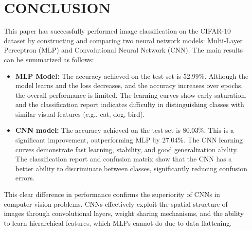 \documentclass[12pt]{article}
\begin{document}
\newpage
\section{CONCLUSION}
This paper has successfully performed image classification on the CIFAR-10 dataset by constructing and comparing two neural network models: Multi-Layer Perceptron (MLP) and Convolutional Neural Network (CNN). The main results can be summarized as follows:
\begin{itemize}
    \item \textbf{MLP Model:} The accuracy achieved on the test set is 52.99\%. Although the model learns and the loss decreases, and the accuracy increases over epochs, the overall performance is limited. The learning curves show early saturation, and the classification report indicates difficulty in distinguishing classes with similar visual features (e.g., cat, dog, bird).
    \item \textbf{CNN model:} The accuracy achieved on the test set is 80.03\%. This is a significant improvement, outperforming MLP by 27.04\%. The CNN learning curves demonstrate fast learning, stability, and good generalization ability. The classification report and confusion matrix show that the CNN has a better ability to discriminate between classes, significantly reducing confusion errors.
\end{itemize}
This clear difference in performance confirms the superiority of CNNs in computer vision problems. CNNs effectively exploit the spatial structure of images through convolutional layers, weight sharing mechanisms, and the ability to learn hierarchical features, which MLPs cannot do due to data flattening.
\end{document}
